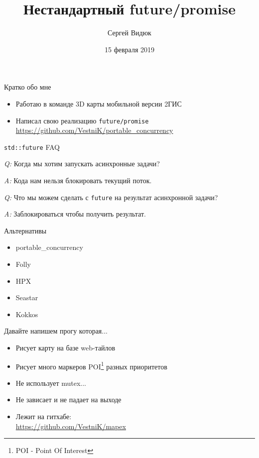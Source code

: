 \documentclass[aspectratio=169,pdf,hyperref={unicode},17pt]{beamer}
\title{Нестандартный future/promise}
\author{Сергей Видюк}
\date{15 февраля 2019}
\begin{document}
\begin{frame}
 \maketitle
\end{frame}

\begin{frame}[t]{Кратко обо мне}
 \begin{itemize}
  \item Работаю в команде 3D карты мобильной версии 2ГИС
  \item Написал свою реализацию \texttt{future/promise} \footnotesize{\url{https://github.com/VestniK/portable_concurrency}}
 \end{itemize}
\end{frame}

\begin{frame}[fragile,t]{\texttt{std::future} FAQ}

{\em Q:} Когда мы хотим запускать асинхронные задачи?

{\em A:} Кода нам нельзя блокировать текущий поток.

{\em Q:} Что мы можем сделать с \texttt{future} на результат асинхронной задачи?

{\em A:} Заблокироваться чтобы получить результат.
\end{frame}

\begin{frame}[fragile,t]{Альтернативы}
\begin{itemize}
  \item portable\_concurrency
  \item Folly
  \item HPX
  \item Seastar
  \item Kokkos
 \end{itemize}
\end{frame}


\begin{frame}[t]{Давайте напишем прогу которая...}
 \begin{itemize}[<+->]
  \item Рисует карту на базе web-тайлов
  \item Рисует много маркеров POI\footnote{POI - Point Of Interest} разных приоритетов
  \item Не использует mutex...
  \item Не зависает и не падает на выходе
  \item Лежит на гитхабе: \\ \footnotesize{\url{https://github.com/VestniK/mapex}}
 \end{itemize}
\end{frame}
\end{document}

